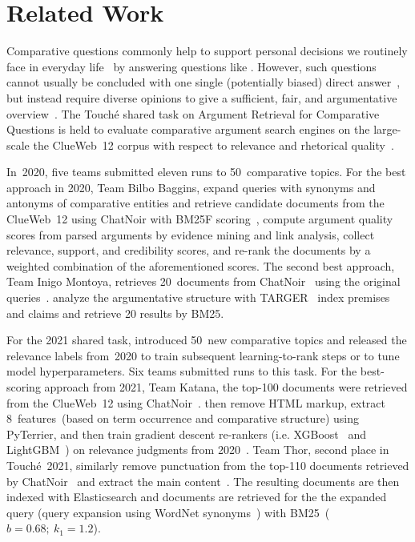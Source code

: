 \section{Related Work}

Comparative questions commonly help to support personal decisions we routinely face in everyday life~\cite{BondarenkoFBGAPBSWPH2020,BondarenkoGFBAPBSWPH2021,BondarenkoFKSGBPBSWPH2022} by answering questions like .
However, such questions cannot usually be concluded with one single (potentially biased) direct answer~\cite{PotthastHS2020}, but instead require diverse opinions to give a sufficient, fair, and argumentative overview~\cite{BondarenkoFBGAPBSWPH2020}.
The Touché shared task on Argument Retrieval for Comparative Questions is held to evaluate comparative argument search engines on the large-scale the ClueWeb~12 corpus with respect to relevance and rhetorical quality~\cite{BondarenkoFBGAPBSWPH2020,BondarenkoGFBAPBSWPH2021,BondarenkoFKSGBPBSWPH2022}.

In~2020, five teams submitted eleven runs to 50~comparative topics.
For the best approach in 2020, Team Bilbo Baggins, \citet{AbyeST2020} expand queries with synonyms and antonyms of comparative entities and retrieve candidate documents from the ClueWeb~12 using ChatNoir with BM25F scoring~\cite{PotthastHSGMTW2012,BevendorffSHP2018}, compute argument quality scores from parsed arguments by evidence mining and link analysis, collect relevance, support, and credibility scores, and re-rank the documents by a weighted combination of the aforementioned scores.
The second best approach, Team Inigo Montoya, retrieves 20~documents from ChatNoir~\cite{BevendorffSHP2018} using the original queries~\cite{Huck2020}. \citeauthor{Huck2020} analyze the argumentative structure
with TARGER~\cite{ChernodubOHBHBP2019} index premises and claims and retrieve 20 results by BM25.

For the 2021 shared task, \citeauthor{BondarenkoGFBAPBSWPH2021} introduced 50~new comparative topics and released the relevance labels from~2020 to train subsequent learning-to-rank steps or to tune model hyperparameters.
Six teams submitted runs to this task.
For the best-scoring approach from 2021, Team Katana, the top-100 documents were retrieved from the ClueWeb~12 using ChatNoir~\cite{BevendorffSHP2018}. \citet{ChekalinaP2021} then remove HTML markup, extract 8~features~(based on term occurrence and comparative structure) using PyTerrier, and then train gradient descent re-rankers (i.e. XGBoost~\cite{ChenG2016} and LightGBM~\cite{KeMFWCMYL2017}) on relevance judgments from 2020~\cite{ChekalinaP2021}.
Team Thor, second place in Touché~2021, similarly remove punctuation from the top-110 documents retrieved by ChatNoir~\cite{BevendorffSHP2018} and extract the main content~\cite{ShirshakovaW2021}. The resulting documents are then indexed with Elasticsearch and documents are retrieved for the the expanded query (query expansion using WordNet synonyms~\cite{Miller1992}) with BM25~(\( b = 0.68;~k_1 = 1.2 \)).

